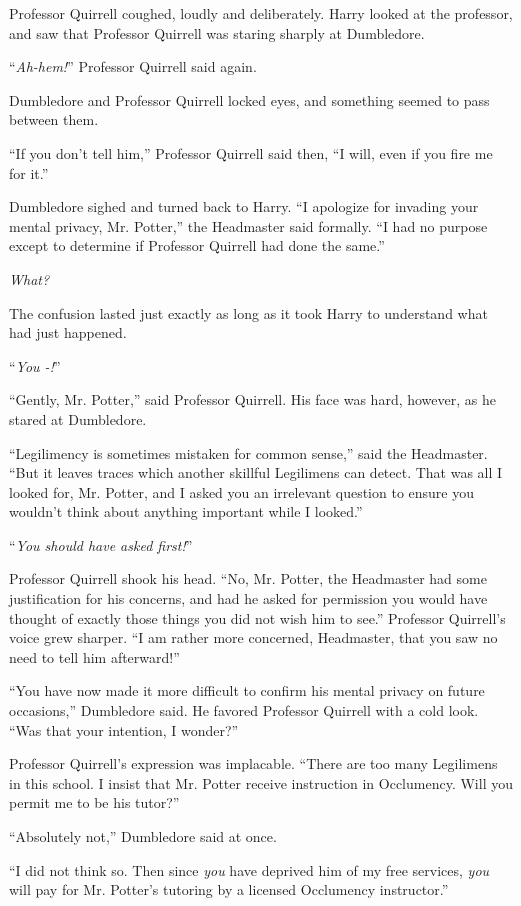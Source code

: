Professor Quirrell coughed, loudly and deliberately. Harry looked at the professor, and saw that Professor Quirrell was staring sharply at Dumbledore.

``\emph{Ah-hem!}'' Professor Quirrell said again.

Dumbledore and Professor Quirrell locked eyes, and something seemed to pass between them.

``If you don't tell him,'' Professor Quirrell said then, ``I will, even if you fire me for it.''

Dumbledore sighed and turned back to Harry. ``I apologize for invading your mental privacy, Mr. Potter,'' the Headmaster said formally. ``I had no purpose except to determine if Professor Quirrell had done the same.''

\emph{What?}

The confusion lasted just exactly as long as it took Harry to understand what had just happened.

``\emph{You -!}''

``Gently, Mr. Potter,'' said Professor Quirrell. His face was hard, however, as he stared at Dumbledore.

``Legilimency is sometimes mistaken for common sense,'' said the Headmaster. ``But it leaves traces which another skillful Legilimens can detect. That was all I looked for, Mr. Potter, and I asked you an irrelevant question to ensure you wouldn't think about anything important while I looked.''

``\emph{You should have asked first!}''

Professor Quirrell shook his head. ``No, Mr. Potter, the Headmaster had some justification for his concerns, and had he asked for permission you would have thought of exactly those things you did not wish him to see.'' Professor Quirrell's voice grew sharper. ``I am rather more concerned, Headmaster, that you saw no need to tell him afterward!''

``You have now made it more difficult to confirm his mental privacy on future occasions,'' Dumbledore said. He favored Professor Quirrell with a cold look. ``Was that your intention, I wonder?''

Professor Quirrell's expression was implacable. ``There are too many Legilimens in this school. I insist that Mr. Potter receive instruction in Occlumency. Will you permit me to be his tutor?''

``Absolutely not,'' Dumbledore said at once.

``I did not think so. Then since \emph{you} have deprived him of my free services, \emph{you} will pay for Mr. Potter's tutoring by a licensed Occlumency instructor.''

